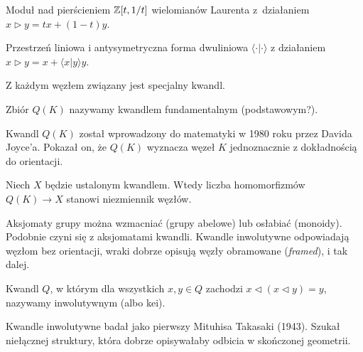 \begin{example}
    Moduł nad pierścieniem $\mathbb Z[t, 1/t]$ wielomianów Laurenta z~działaniem $x \triangleright y =tx + (1-t) y$.
\end{example}

\begin{example}
    Przestrzeń liniowa i antysymetryczna forma dwuliniowa $\langle \cdot | \cdot \rangle$ z działaniem $x \triangleright y = x + \langle x | y \rangle y$.
\end{example}

Z każdym węzłem związany jest specjalny kwandl.

\begin{definition}
    Zbiór $Q(K)$ nazywamy kwandlem fundamentalnym (podstawowym?).
\end{definition}

Kwandl $Q(K)$ został wprowadzony do matematyki w 1980 roku przez Davida Joyce'a.
Pokazał on, że $Q(K)$ wyznacza węzeł $K$ jednoznacznie z dokładnością do orientacji.

\begin{proposition}
    Niech $X$ będzie ustalonym kwandlem.
    Wtedy liczba homomorfizmów $Q(K) \to X$ stanowi niezmiennik węzłów.
\end{proposition}

Aksjomaty grupy można wzmacniać (grupy abelowe) lub osłabiać (monoidy).
Podobnie czyni się z aksjomatami kwandli.
Kwandle inwolutywne odpowiadają węzłom bez orientacji, wraki dobrze opisują węzły obramowane (\emph{framed}), i tak dalej.

\begin{definition}
    Kwandl $Q$, w którym dla wszystkich $x, y \in Q$ zachodzi $x \triangleleft (x \triangleleft y) = y$, nazywamy inwolutywnym (albo kei).
\end{definition}

Kwandle inwolutywne badał jako pierwszy Mituhisa Takasaki (1943).
Szukał niełącznej struktury, która dobrze opisywałaby odbicia w skończonej geometrii.

